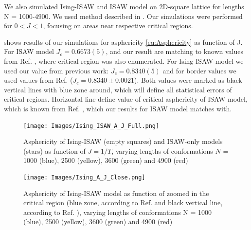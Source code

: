 \documentclass[a4paper]{jpconf}
\begin{document}

We also simulated Ising-ISAW and ISAW model on 2D-square lattice for lengths N = 1000-4900.  
We used method described in \cite{faizullina2021critical}. 
Our simulations were performed for $0 < J < 1$, focusing on areas near respective critical regions.

 shows results of our simulations for asphericity \eqref{eq:Asphericity} as function of J. 
For ISAW model $J_{c} = 0.6673(5)$, and our result are matching to known values from  Ref. \cite{Caracciolo2011}, where critical region was also enumerated.
For Ising-ISAW model we used our value from previous work: $J_{c} = 0.8340(5)$ \cite{faizullina2021critical} and for border values we used values from Ref.\cite{Foster2021} ($J_{c} = 0.8340 \pm 0.0021$). 
Both values were marked as black vertical lines with blue zone around, which will define all statistical errors of critical regions. 
Horizontal line define value of critical asphericity of ISAW model, which is known from Ref. \cite{Caracciolo2011}, which our results for ISAW model matches with.


\begin{figure}[h!]
    \begin{minipage}{0.48\textwidth}
        \texttt{[image: Images/Ising\_ISAW\_A\_J\_Full.png]}
        \caption{Asphericity of Ising-ISAW (empty squares) and ISAW-only models (stars) as function of $J=1/T$, varying lengths of conformations $N$ = 1000 (blue), 2500 (yellow), 3600 (green) and 4900 (red)}
        \label{fig:Ising&ISAW_A_J}
    \end{minipage}
    \hfill
    \begin{minipage}{0.48\textwidth}
        \texttt{[image: Images/Ising\_A\_J\_Close.png]}
        \caption{Asphericity of Ising-ISAW model as function of zoomed in the critical region (blue zone, according to Ref. \cite{Foster2021} and black vertical line, according to Ref. \cite{faizullina2021critical}), varying lengths of conformations N = 1000 (blue), 2500 (yellow), 3600 (green) and 4900 (red)}
        \label{fig:Ising_A_J}
    \end{minipage}
\end{figure}

\begin{figure}[h!]
    \centering
    
\end{figure}
\end{document}
